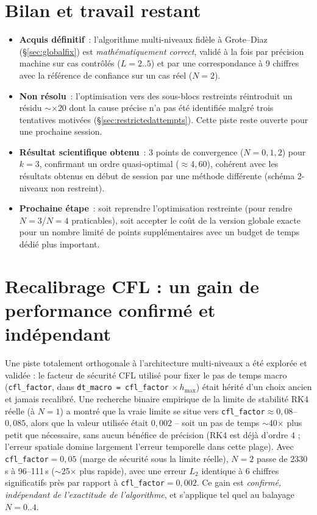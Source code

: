 \documentclass[11pt]{article}
\begin{document}
\section{Bilan et travail restant}

\begin{itemize}
  \item \textbf{Acquis définitif}~: l'algorithme multi-niveaux
  fidèle à Grote--Diaz (\S\ref{sec:globalfix}) est \emph{mathématiquement
  correct}, validé à la fois par précision machine sur cas contrôlés
  ($L=2..5$) et par une correspondance à 9 chiffres avec la référence
  de confiance sur un cas réel ($N=2$).
  \item \textbf{Non résolu}~: l'optimisation vers des sous-blocs
  restreints réintroduit un résidu $\sim\times20$ dont la cause précise
  n'a pas été identifiée malgré trois tentatives motivées
  (\S\ref{sec:restrictedattempts}). Cette piste reste ouverte pour une
  prochaine session.
  \item \textbf{Résultat scientifique obtenu}~: 3 points de convergence
  ($N=0,1,2$) pour $k=3$, confirmant un ordre quasi-optimal
  ($\approx4{,}60$), cohérent avec les résultats obtenus en début de
  session par une méthode différente (schéma 2-niveaux non restreint).
  \item \textbf{Prochaine étape}~: soit reprendre l'optimisation
  restreinte (pour rendre $N=3$/$N=4$ praticables), soit accepter le
  coût de la version globale exacte pour un nombre limité de points
  supplémentaires avec un budget de temps dédié plus important.
\end{itemize}

\section{Recalibrage CFL : un gain de performance confirmé et indépendant}
\label{sec:cflfix}

Une piste totalement orthogonale à l'architecture multi-niveaux a été
explorée et validée : le facteur de sécurité CFL utilisé pour fixer le
pas de temps macro (\texttt{cfl\_factor}, dans \texttt{dt\_macro =
cfl\_factor} $\times\, h_{\max}$) était hérité d'un choix ancien et
jamais recalibré. Une recherche binaire empirique de la limite de
stabilité RK4 réelle (à $N=1$) a montré que la vraie limite se situe
vers \texttt{cfl\_factor}$\approx 0{,}08$--$0{,}085$, alors que la valeur
utilisée était $0{,}002$ -- soit un pas de temps $\sim$40$\times$ plus
petit que nécessaire, sans aucun bénéfice de précision (RK4 est déjà
d'ordre 4 ; l'erreur spatiale domine largement l'erreur temporelle dans
cette plage). Avec \texttt{cfl\_factor}$=0{,}05$ (marge de sécurité
sous la limite réelle), $N=2$ passe de 2330\,s à 96--111\,s
($\sim$25$\times$ plus rapide), avec une erreur $L_2$ identique à 6
chiffres significatifs près par rapport à \texttt{cfl\_factor}$=0{,}002$.
Ce gain est \emph{confirmé, indépendant de l'exactitude de
l'algorithme}, et s'applique tel quel au balayage $N=0..4$.
\end{document}
